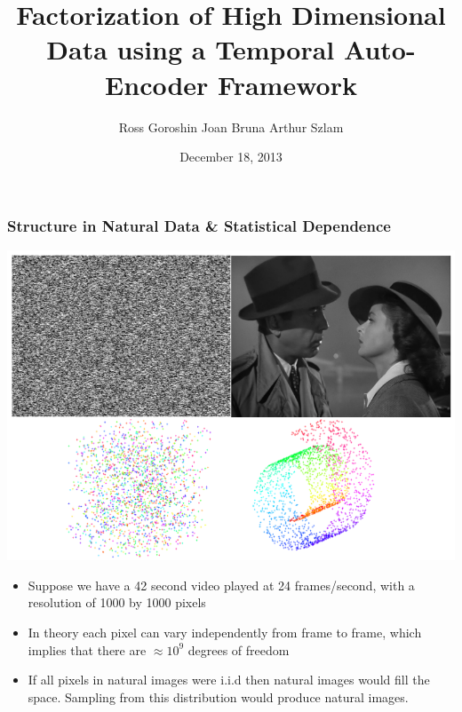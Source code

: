 \documentclass{beamer}
\title{Factorization of High Dimensional Data using a Temporal Auto-Encoder Framework}
\date{December 18, 2013}
\author{Ross Goroshin \hspace{0.20cm} Joan Bruna \hspace{0.20cm} Arthur Szlam}
\begin{document}
\begin{frame}
\titlepage
\end{frame}

\begin{frame}
\frametitle{Structure in Natural Data \& Statistical Dependence}  
\begin{center}
\includegraphics[scale=0.2]{./figures/structure.png}
\begin{itemize} 
\item Suppose we have a 42 second video played at 24 frames/second, with a resolution of 1000 by 1000 pixels
\item In theory each pixel can vary independently from frame to frame, which implies that there are $\approx 10^9$ degrees of freedom 
\item If all pixels in natural images were i.i.d then natural images would fill the space. Sampling from this distribution would produce natural images.
\end{itemize} 
\end{center}
\end{frame}
\end{document}
